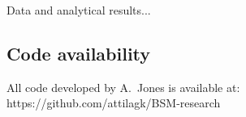 \documentclass[letterpaper]{article}
\begin{document}
Data and analytical results...

\subsection*{Code availability}

All code developed by A.~Jones is available at:\\
https://github.com/attilagk/BSM-research


%
%
%
%
%
\end{document}
